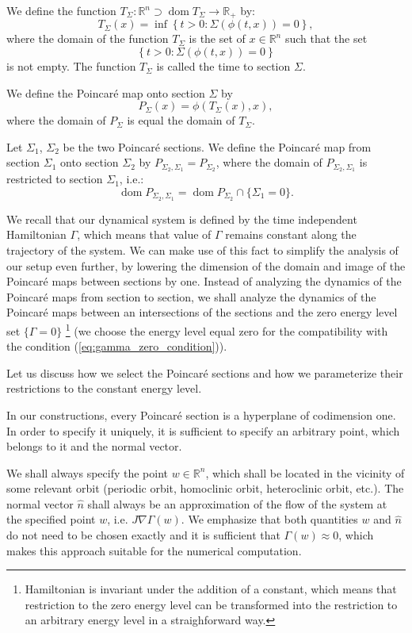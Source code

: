 \documentclass[1p]{article}
\DeclareMathOperator{\dom}{dom}
\begin{document}
We define the function $T_{\Sigma} : \mathbb{R}^{n} \supset \dom T_\Sigma \to \mathbb{R}_+$ by:
\[
    T_\Sigma (x) = \inf \left\{ t > 0: \Sigma \left( \phi(t,x) \right) = 0 \right\},
\]
where the domain of the function $T_\Sigma$ is the set of $x\in\mathbb{R}^{n}$ such that the set
\[
    \left\{ t > 0: \Sigma \left( \phi(t,x) \right) = 0 \right\}
\]
is not empty. The function $T_\Sigma$ is called the time to section $\Sigma$.

We define the Poincar\'e map onto section $\Sigma$ by
\[
    P_\Sigma (x) = \phi( T_\Sigma(x), x),
\]
where the domain of $P_\Sigma$ is equal the domain of $T_\Sigma$.

Let $\Sigma_1$, $\Sigma_2$ be the two Poincar\'e sections. We define the Poincar\'e map from section $\Sigma_1$ onto section $\Sigma_2$ by $P_{\Sigma_2, \Sigma_1} = P_{\Sigma_2}$, where the domain of $P_{\Sigma_2, \Sigma_1}$ is restricted to section $\Sigma_1$, i.e.:
\[
    \dom P_{\Sigma_2, \Sigma_1} = \dom P_{\Sigma_2} \cap \{ \Sigma_1 = 0 \}.
\]

We recall that our dynamical system is defined by the time independent Hamiltonian $\Gamma$, which means that value of $\Gamma$ remains constant along the trajectory of the system. We can make use of this fact to simplify the analysis of our setup even further, by lowering the dimension of the domain and image of the Poincar\'e maps between sections by one. Instead of analyzing the dynamics of the Poincar\'e maps from section to section, we shall analyze the dynamics of the Poincar\'e maps between an intersections of the sections and the zero energy level set $\{ \Gamma = 0 \}$ \footnote{Hamiltonian is invariant under the addition of a constant, which means that restriction to the zero energy level can be transformed into the restriction to an arbitrary energy level in a straighforward way.} (we choose the energy level equal zero for the compatibility with the condition (\ref{eq:gamma_zero_condition})).

Let us discuss how we select the Poincar\'e sections and how we parameterize their restrictions to the constant energy level.

In our constructions, every Poincar\'e section is a hyperplane of codimension one. In order to specify it uniquely, it is sufficient to specify an arbitrary point, which belongs to it and the normal vector.

We shall always specify the point $w \in \mathbb{R}^n$, which shall be located in the vicinity of some relevant orbit (periodic orbit, homoclinic orbit, heteroclinic orbit, etc.). The normal vector $\hat{n}$ shall always be an approximation of the flow of the system at the specified point $w$, i.e. $J \nabla \Gamma(w)$. We emphasize that both quantities $w$ and $\hat{n}$ do not need to be chosen exactly and it is sufficient that $\Gamma(w) \approx 0$, which makes this approach suitable for the numerical computation.
\end{document}
